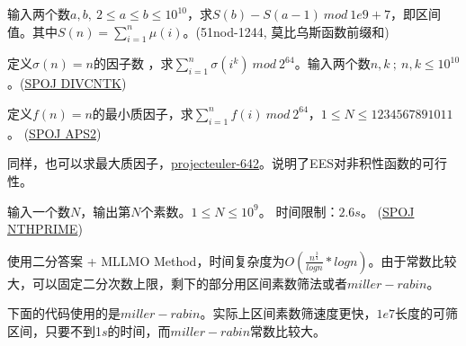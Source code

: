 \vbox{}





\begin{example}
	输入两个数$a,b,\ 2\le a\le b\le 10^{10}$，求$S(b)-S(a-1)\ mod\ 1e9+7$，即区间值。其中$S(n)=\sum_{i=1}^{n}\mu(i)$。(51nod-1244, 莫比乌斯函数前缀和)
\end{example}
 







\vbox{}





\begin{example}
	定义$\sigma(n)=n$的因子数  ，求$\sum_{i=1}^n\sigma(i^k)  \ mod  \ 2^{64}$。输入两个数$n,k\ ;\ n,k \le 10^{10}$。(\href{https://www.spoj.com/problems/DIVCNTK/}{SPOJ DIVCNTK})      
\end{example}
  







\vbox{}




\begin{example}
定义$f(n)=n$的最小质因子，求$\sum_{i=1}^nf(i)   \ mod \ 2^{64}$，$1\le N\le 1234567891011$。   
(\href{https://www.spoj.com/problems/APS2/}{SPOJ APS2})
\end{example}



\begin{note}
	同样，也可以求最大质因子，\href{https://projecteuler.net/problem=642}{projecteuler-642}。说明了EES对非积性函数的可行性。
\end{note} 
 
 
 
 
\vbox{}




\begin{example}
输入一个数$N$，输出第$N$个素数。$1\le N\le 10^9$。 时间限制：$2.6s$。
(\href{https://www.spoj.com/problems/NTHPRIME/en/}{SPOJ NTHPRIME})
\end{example}

\begin{solution}
	使用二分答案 + MLLMO Method，时间复杂度为$O(\frac {n^{\frac 3 4}}{ log n} * log n)$。由于常数比较大，可以固定二分次数上限，剩下的部分用区间素数筛法或者$miller-rabin$。
	
	下面的代码使用的是$miller-rabin$。{\heiti 实际上区间素数筛速度更快，$1e7$长度的可筛区间，只要不到1$s$的时间，而$miller-rabin$常数比较大。}
\end{solution}

